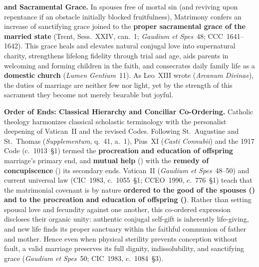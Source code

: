 \textbf{ and Sacramental Grace.} In spouses free of mortal sin (and reviving upon repentance if an obstacle initially blocked fruitfulness), Matrimony confers an increase of sanctifying grace joined to the \textbf{proper sacramental grace of the married state} (Trent, Sess.~XXIV, can.~1; \emph{Gaudium et Spes}~48; CCC~1641--1642). This grace heals and elevates natural conjugal love into supernatural charity, strengthens lifelong fidelity through trial and age, aids parents in welcoming and forming children in the faith, and consecrates daily family life as a \textbf{domestic church} (\emph{Lumen Gentium}~11). As Leo~XIII wrote (\emph{Arcanum Divinae}), the duties of marriage are neither few nor light, yet by the strength of this sacrament they become not merely bearable but joyful.

\textbf{Order of Ends: Classical Hierarchy and Conciliar Co-Ordering.} Catholic theology harmonizes classical scholastic terminology with the personalist deepening of Vatican~II and the revised Codes. Following St.~Augustine and St.~Thomas (\emph{Supplementum}, q.~41, a.~1), Pius~XI (\emph{Casti Connubii}) and the 1917 Code (c.~1013~\S1) termed the \textbf{procreation and education of offspring} marriage's primary end, and \textbf{mutual help} () with the \textbf{remedy of concupiscence} () its secondary ends. Vatican~II (\emph{Gaudium et Spes}~48--50) and current universal law (CIC~1983, c.~1055~\S1; CCEO~1990, c.~776~\S1) teach that the matrimonial covenant is by nature \textbf{ordered to the good of the spouses () and to the procreation and education of offspring ()}. Rather than setting spousal love and fecundity against one another, this co-ordered expression discloses their organic unity: authentic conjugal self-gift is inherently life-giving, and new life finds its proper sanctuary within the faithful communion of father and mother. Hence even when physical sterility prevents conception without fault, a valid marriage preserves its full dignity, indissolubility, and sanctifying grace (\emph{Gaudium et Spes}~50; CIC~1983, c.~1084~\S3).

